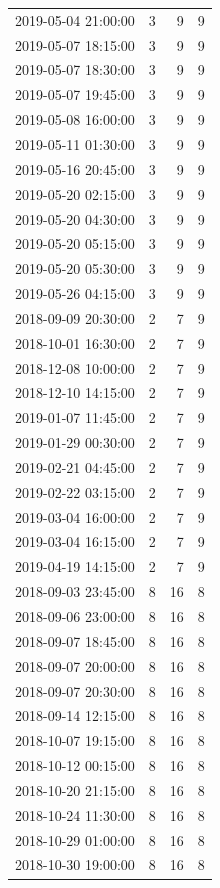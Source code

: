 \begin{tabular}{lrrr}
2019-05-04 21:00:00 & 3 & 9 & 9 \\
2019-05-07 18:15:00 & 3 & 9 & 9 \\
2019-05-07 18:30:00 & 3 & 9 & 9 \\
2019-05-07 19:45:00 & 3 & 9 & 9 \\
2019-05-08 16:00:00 & 3 & 9 & 9 \\
2019-05-11 01:30:00 & 3 & 9 & 9 \\
2019-05-16 20:45:00 & 3 & 9 & 9 \\
2019-05-20 02:15:00 & 3 & 9 & 9 \\
2019-05-20 04:30:00 & 3 & 9 & 9 \\
2019-05-20 05:15:00 & 3 & 9 & 9 \\
2019-05-20 05:30:00 & 3 & 9 & 9 \\
2019-05-26 04:15:00 & 3 & 9 & 9 \\
2018-09-09 20:30:00 & 2 & 7 & 9 \\
2018-10-01 16:30:00 & 2 & 7 & 9 \\
2018-12-08 10:00:00 & 2 & 7 & 9 \\
2018-12-10 14:15:00 & 2 & 7 & 9 \\
2019-01-07 11:45:00 & 2 & 7 & 9 \\
2019-01-29 00:30:00 & 2 & 7 & 9 \\
2019-02-21 04:45:00 & 2 & 7 & 9 \\
2019-02-22 03:15:00 & 2 & 7 & 9 \\
2019-03-04 16:00:00 & 2 & 7 & 9 \\
2019-03-04 16:15:00 & 2 & 7 & 9 \\
2019-04-19 14:15:00 & 2 & 7 & 9 \\
2018-09-03 23:45:00 & 8 & 16 & 8 \\
2018-09-06 23:00:00 & 8 & 16 & 8 \\
2018-09-07 18:45:00 & 8 & 16 & 8 \\
2018-09-07 20:00:00 & 8 & 16 & 8 \\
2018-09-07 20:30:00 & 8 & 16 & 8 \\
2018-09-14 12:15:00 & 8 & 16 & 8 \\
2018-10-07 19:15:00 & 8 & 16 & 8 \\
2018-10-12 00:15:00 & 8 & 16 & 8 \\
2018-10-20 21:15:00 & 8 & 16 & 8 \\
2018-10-24 11:30:00 & 8 & 16 & 8 \\
2018-10-29 01:00:00 & 8 & 16 & 8 \\
2018-10-30 19:00:00 & 8 & 16 & 8 \\

\end{tabular}
